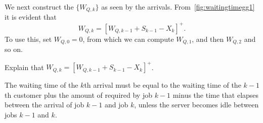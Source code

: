 We next construct the  $\{W_{Q,k}\}$ as seen by the arrivals.
From~\cref{fig:waitingtimegg1} it is evident that 
\begin{equation}\label{eq:56}
 W_{Q,k} = [W_{Q,k-1} + S_{k-1}-X_k]^+.
\end{equation}
To use this, set $W_{Q,0}=0$, from which we can compute $W_{Q,1}$, and then $W_{Q,2}$ and so on.

\begin{extra}
Explain that $W_{Q,k} = [W_{Q,k-1} + S_{k-1}-X_k]^+$. 
\begin{solution}
The waiting time of the $k$th arrival must be equal to the waiting time of the $k-1$th customer plus the amount of  required by job $k-1$ minus the time that elapses between the arrival of job $k-1$ and job $k$, unless the server becomes idle between jobs $k-1$ and $k$.
\end{solution}
\end{extra}

